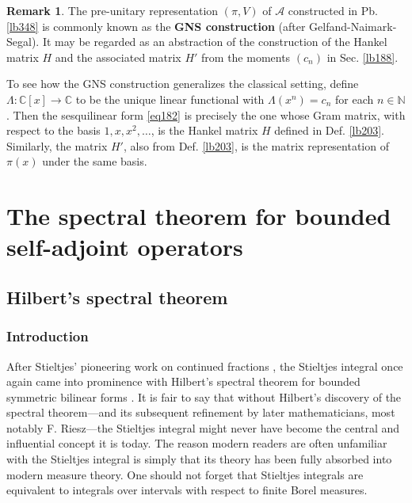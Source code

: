 \documentclass[12pt,b5paper,notitlepage]{article}
\theoremstyle{definition}
\newtheorem{rem}[df]{Remark}
\theoremstyle{plain}
\newcommand{\Cbb}{\mathbb C}
\newcommand{\Nbb}{\mathbb N}
\newcommand{\SA}{\mathscr A}
\newcommand{\hqed}{\hfill\qedsymbol}
\numberwithin{equation}{section}
\begin{document}
\begin{rem}\label{lb349}
The pre-unitary representation $(\pi,V)$ of $\SA$ constructed in Pb. \ref{lb348} is commonly known as the \textbf{GNS construction}  (after Gelfand-Naimark-Segal). It may be regarded as an abstraction of the construction of the Hankel matrix $H$ and the associated matrix $H'$ from the moments $(c_n)$ in Sec. \ref{lb188}.

To see how the GNS construction generalizes the classical setting, define $\Lambda:\Cbb[x]\rightarrow\Cbb$ to be the unique linear functional with $\Lambda(x^n)=c_n$ for each $n\in\Nbb$. Then the sesquilinear form \eqref{eq182} is precisely the one whose Gram matrix, with respect to the basis $1,x,x^2,\dots$, is the Hankel matrix $H$ defined in Def. \ref{lb203}. Similarly, the matrix $H'$, also from Def. \ref{lb203}, is the matrix representation of $\pi(x)$ under the same basis.  \hqed
\end{rem}











\newpage

\section{The spectral theorem for bounded self-adjoint operators}\label{lb181}



\subsection{Hilbert's spectral theorem}\label{lb442}


\subsubsection{Introduction}

After Stieltjes' pioneering work on continued fractions \cite{Sti94}, the Stieltjes integral once again came into prominence with Hilbert’s spectral theorem for bounded symmetric bilinear forms \cite{Hil06}. It is fair to say that without Hilbert's discovery of the spectral theorem---and its subsequent refinement by later mathematicians, most notably F. Riesz---the Stieltjes integral might never have become the central and influential concept it is today. The reason modern readers are often unfamiliar with the Stieltjes integral is simply that its theory has been fully absorbed into modern measure theory. One should not forget that Stieltjes integrals are equivalent to integrals over intervals with respect to finite Borel measures.
\end{document}
